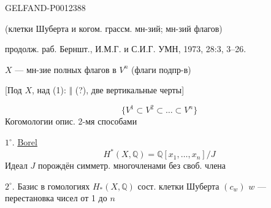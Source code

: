 \begin{GelfandAdjacentEvidence}{GELFAND-P001238}{8}


(клетки Шуберта и когом. грассм. мн-зий; мн-зий флагов)

продолж. раб. Берншт., И.М.Г. и С.И.Г. УМН, 1973, 28:3, 3–26.

$X$ — мн-зие полных флагов в $V^n$ (флаги подпр-в)

[Под $X$, над (1): $\Vert$ (?), две вертикальные черты]
\end{GelfandAdjacentEvidence}

\begin{equation*}
\{V^1\subset V^2\subset\ldots\subset V^n\}
\tag{1}
\end{equation*}
Когомологии опис. 2-мя способами

$1^{\circ}.$ \underline{Borel}
\begin{equation*}
H^*(X,\mathbb Q)=\mathbb Q[x_1,\ldots,x_n]/J
\end{equation*}
Идеал $J$ порождён симметр. многочленами без своб. члена

$2^{\circ}.$ Базис в гомологиях $H_*(X,\mathbb Q)$ сост. клетки Шуберта $(c_w)$
\nopagebreak[4]
$w$ — перестановка чисел от 1 до $n$


